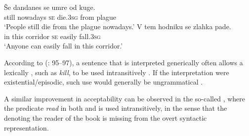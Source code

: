 \documentclass[output=paper,nonflat,newtxmath]{langsci/langscibook}
\begin{document}
\begin{exe}
\ex \label{ex:lenardic: 31} \begin{xlist}
 \label{ex:lenardic: 31a}
 \label{ex:lenardic: 31b}
\end{xlist}
\ex \label{ex:lenardic: 32} \begin{xlist}
\ex \label{ex:lenardic: 32a}\gll Še dandanes se umre od kuge.\\
still nowadays \textsc{se} die.\textsc{3sg} from plague\\
\trans `People still die from the plague nowadays.'
\ex \label{ex:lenardic: 32b} \gll V tem hodniku se zlahka pade.\\
in this corridor \textsc{se} easily fall.\textsc{3sg}\\
\trans `Anyone can easily fall in this corridor.'
\end{xlist}
\end{exe}

\noindent According to \citeauthor{hartl2012} (\citeyear{hartl2012}: 95--97), a sentence that is interpreted generically often allows a lexically , such as \textit{kill}, to be used intransitively . If the interpretation were existential/episodic, such use would generally be ungrammatical .
\largerpage[2]

\begin{exe}
\ex \label{ex:lenardic: 33}
\begin{xlist}
\label{ex:lenardic: 33a}
 \label{ex:lenardic: 33b}
\end{xlist}
\end{exe}

\noindent A similar improvement in acceptability can be observed in the so-called , where the predicate \textit{read} in both  and  is used intransitively, in the sense that the  denoting the reader of the book is missing from the overt syntactic representation.
\end{document}
